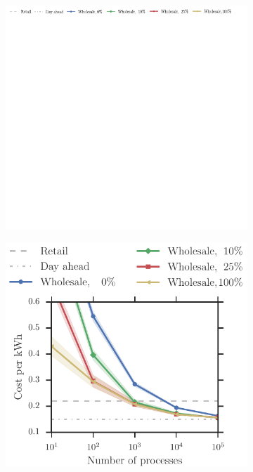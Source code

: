 \documentclass[conference]{IEEEtran}
\begin{document}
\begin{figure}[t!]
\centering
	\begin{subfigure}[b]{1.0\textwidth}
	\centering
	\includegraphics[scale=1.5, clip=true, trim=0cm 8.3cm 0 0]{figures/Wholesale_flex_legend.pdf}
	\end{subfigure}
	\begin{subfigure}[b]{0.32\textwidth}
	\includegraphics[width=1.0\textwidth, clip=true, trim=0 0 0 2cm]{figures/Wholesale.pdf}

\end{subfigure}
\end{figure}
\end{document}
